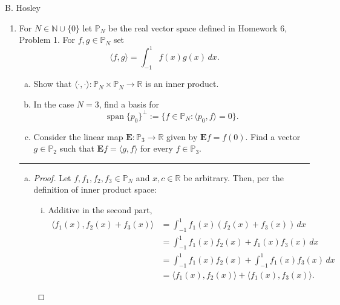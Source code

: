 \documentclass[12pt]{amsart}
\newcommand{\1}{\mathbbm{1}}
\numberwithin{equation}{section}
\numberwithin{Theorem}{section}
\theoremstyle{plain} %
\theoremstyle{definition}
\theoremstyle{remark}
\begin{document}
\thispagestyle{empty}

\hspace{\fill} {\Large B. Hosley}
\bigskip


\begin{enumerate}[1.]

\item For \(N\in\mathbb{N}\cup\{0\}\) let \(\mathbb{P}_{N}\) be the real vector space defined in Homework 6, Problem 1. For \(f,g\in\mathbb{P}_{N}\) set
\[\langle f,g\rangle = \int_{-1}^{1}f(x)g(x)\,dx.\]

\begin{enumerate}[(a)]
\item Show that \(\langle\cdot,\cdot\rangle:\mathbb{P}_{N}\times\mathbb{P}_{N}\to\mathbb{R}\) is an inner product.\medskip

\item In the case \(N=3\), find a basis for 
\[\operatorname{span}\{p_{0}\}^{\bot}:=\{f\in\mathbb{P}_{N} : \langle p_{0},f\rangle = 0\}.\]

\item Consider the linear map \(\mathbf{E}:\mathbb{P}_{3}\to\mathbb{R}\) given by \(\mathbf{E}f = f(0)\). Find a vector \(g\in\mathbb{P}_{2}\) such that \(\mathbf{E}f = \langle g,f\rangle\) for every \(f\in\mathbb{P}_{3}\).

\end{enumerate}\bigskip

\hrule
\bigskip
\begin{enumerate}[(a)]
\item
\begin{proof}
Let \(f,f_1,f_2,f_3\in\mathbb{P}_N\) and \(x,c\in\mathbb{R}\) be arbitrary.
Then, per the definition of inner product space:
\begin{enumerate}[i.]
	\item Additive in the second part,
	\begin{align*}
		\langle f_1(x), f_2(x)+f_3(x) \rangle
		&= \int_{-1}^{1}f_1(x) (f_2(x)+f_3(x))\,dx \\
		&= \int_{-1}^{1}f_1(x)f_2(x)+ f_1(x)f_3(x)\,dx \\
		&= \int_{-1}^{1}f_1(x)f_2(x)+ \int_{-1}^{1}f_1(x)f_3(x)\,dx \\
		&= \langle f_1(x),f_2(x)\rangle + \langle f_1(x),f_3(x)\rangle .
	\end{align*}
	

\end{enumerate}
\end{proof}
\end{enumerate}
\end{enumerate}
\end{document}
